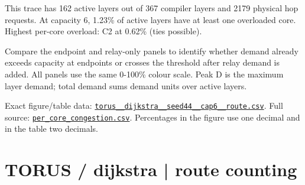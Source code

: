\documentclass[10pt,a4paper]{article}
\begin{document}
This trace has 162 active layers out of 367 compiler layers and 2179 physical hop requests. At capacity 6, 1.23\% of active layers have at least one overloaded core. Highest per-core overload: C2 at 0.62\% (ties possible).\par
Compare the endpoint and relay-only panels to identify whether demand already exceeds capacity at endpoints or crosses the threshold after relay demand is added. All panels use the same 0-100\% colour scale. Peak D is the maximum layer demand; total demand sums demand units over active layers.\par
Exact figure/table data: \href{\detokenize{file:///home/dhruv-pansuriya/Documents/BTP/Compiler-Driven-ACE/output/pdf/qaoa_methods_congestion/tables/torus__dijkstra__seed44__cap6__route.csv}}{\nolinkurl{torus__dijkstra__seed44__cap6__route.csv}}. Full source: \href{\detokenize{file:///home/dhruv-pansuriya/Documents/BTP/Compiler-Driven-ACE/results/qaoa_2seed_2026-10-26/congestion/per_core_congestion.csv}}{\nolinkurl{per_core_congestion.csv}}. Percentages in the figure use one decimal and in the table two decimals.\par
\clearpage
\section*{TORUS / dijkstra | route counting}
\end{document}
